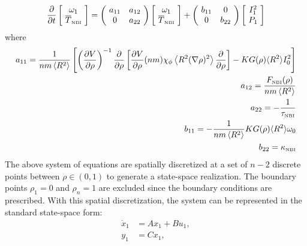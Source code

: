 \documentclass[12pt]{iopart}
\begin{document}
\begin{equation}
\frac{\partial}{\partial t}   \left[\! \begin{array}{c}  \omega_1 \\ \overline{T}_\textrm{\tiny{NBI}} \end{array}\!\right]
  ={ \left(\! \begin{array}{cc} a_{11}  & a_{12} \\ 0 & a_{22} \end{array} \! \right)} \left[\! \begin{array}{c} \omega_1 \\ \overline{T}_\textrm{\tiny{NBI}}    \end{array}  \!\right] + \left(\! \begin{array}{cc} b_{11}  & 0 \\ 0 & b_{22}    \end{array}  \!\right) \left[\! \begin{array}{c}  I^2_1 \\ P_1\end{array}\!\right]
\label{SSR}
\end{equation}
 where
 \begin{eqnarray}
 a_{11} =  \frac{1}{n m \left<R^2\right>} \left[ \left( \frac{\partial V}{\partial\rho}\right)^{-1}
   \frac{\partial}{\partial \rho} 
   \left[\frac{\partial V}{\partial \rho}(n m)\chi_\phi 
   \left< R^2 (\nabla \rho)^2\right> 
   \frac{\partial}{\partial\rho}\right]-K G(\rho) \langle R^2 \rangle  I^2_0 \right]  \nonumber \\
 a_{12} =  \frac{ F_\textrm{\tiny{NBI}}(\rho) }{n m \left<R^2\right>}\nonumber \\
 a_{22} = - \frac{1}{\tau_\textrm{\tiny{NBI}}}  \nonumber \\  
 b_{11} = - \frac{1}{n m \left<R^2\right>} K G(\rho) \langle R^2 \rangle  \omega_0 \nonumber \\
 b_{22} = \kappa_\textrm{\tiny{NBI}} \nonumber
 \end{eqnarray}
 The above system of equations are spatially discretized at a set of $n-2$ discrete points between $\rho \in (0,1)$ to generate a state-space realization. The boundary points $\rho_1 = 0$ and $\rho_n =1$ are excluded since the boundary conditions are prescribed. With this spatial discretization, the system can be represented in the standard state-space form:
\begin{eqnarray}
 \dot{x}_1 &= A x_1 + B u_{1} ,\label{eqn:state-space1} \\
 y_1 &= C x_1, \label{eqn:state-space2} 
\end{eqnarray}
\end{document}
